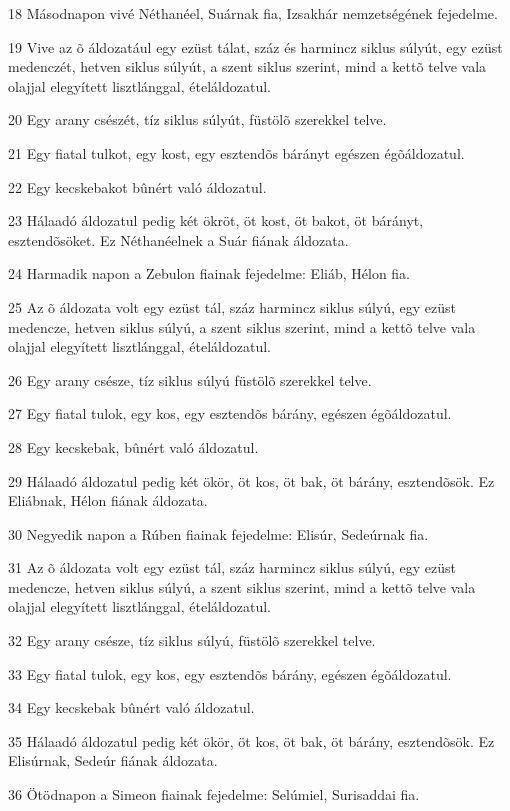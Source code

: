 \par 18 Másodnapon vivé Néthanéel, Suárnak fia, Izsakhár nemzetségének fejedelme.
\par 19 Vive az õ áldozatául egy ezüst tálat, száz és harmincz siklus súlyút, egy ezüst medenczét, hetven siklus súlyút, a szent siklus szerint, mind a kettõ telve vala olajjal elegyített lisztlánggal, ételáldozatul.
\par 20 Egy arany csészét, tíz siklus súlyút, füstölõ szerekkel telve.
\par 21 Egy fiatal tulkot, egy kost, egy esztendõs bárányt egészen égõáldozatul.
\par 22 Egy kecskebakot bûnért való áldozatul.
\par 23 Hálaadó áldozatul pedig két ökröt, öt kost, öt bakot, öt bárányt, esztendõsöket. Ez Néthanéelnek a Suár fiának áldozata.
\par 24 Harmadik napon a Zebulon fiainak fejedelme: Eliáb, Hélon fia.
\par 25 Az õ áldozata volt egy ezüst tál, száz harmincz siklus súlyú, egy ezüst medencze, hetven siklus súlyú, a szent siklus szerint, mind a kettõ telve vala olajjal elegyített lisztlánggal, ételáldozatul.
\par 26 Egy arany csésze, tíz siklus súlyú füstölõ szerekkel telve.
\par 27 Egy fiatal tulok, egy kos, egy esztendõs bárány, egészen égõáldozatul.
\par 28 Egy kecskebak, bûnért való áldozatul.
\par 29 Hálaadó áldozatul pedig két ökör, öt kos, öt bak, öt bárány, esztendõsök. Ez Eliábnak, Hélon fiának áldozata.
\par 30 Negyedik napon a Rúben fiainak fejedelme: Elisúr, Sedeúrnak fia.
\par 31 Az õ áldozata volt egy ezüst tál, száz harmincz siklus súlyú, egy ezüst medencze, hetven siklus súlyú, a szent siklus szerint, mind a kettõ telve vala olajjal elegyített lisztlánggal, ételáldozatul.
\par 32 Egy arany csésze, tíz siklus súlyú, füstölõ szerekkel telve.
\par 33 Egy fiatal tulok, egy kos, egy esztendõs bárány, egészen égõáldozatul.
\par 34 Egy kecskebak bûnért való áldozatul.
\par 35 Hálaadó áldozatul pedig két ökör, öt kos, öt bak, öt bárány, esztendõsök. Ez Elisúrnak, Sedeúr fiának áldozata.
\par 36 Ötödnapon a Simeon fiainak fejedelme: Selúmiel, Surisaddai fia.
